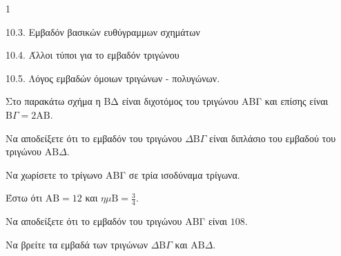 \begin{ylh}{1}
    \item 10.3. Εμβαδόν βασικών ευθύγραμμων σχημάτων
    \item 10.4. Άλλοι τύποι για το εμβαδόν τριγώνου
    \item 10.5. Λόγος εμβαδών όμοιων τριγώνων - πολυγώνων.
\end{ylh}
\begin{figure} %
    \centering
\end{figure}
Στο παρακάτω σχήμα η ΒΔ είναι διχοτόμος του τριγώνου ΑΒΓ και επίσης είναι $\text{B}\Gamma = 2\text{AB}$.
\begin{alist}
    \item Να αποδείξετε ότι το εμβαδόν του τριγώνου $\Delta\text{B}\Gamma$ είναι διπλάσιο του εμβαδού του τριγώνου $\text{AB}\Delta$. 
    \item Να χωρίσετε το τρίγωνο ΑΒΓ σε τρία ισοδύναμα τρίγωνα. 
    \item Έστω ότι $\text{AB} = 12$ και $\eta\mu \text{B} = \frac{3}{4}$.
    \begin{rlist}
        \item Να αποδείξετε ότι το εμβαδόν του τριγώνου ΑΒΓ είναι $108$. 
        \item Να βρείτε τα εμβαδά των τριγώνων $\Delta\text{B}\Gamma$ και $\text{AB}\Delta$. 
    \end{rlist}
\end{alist}